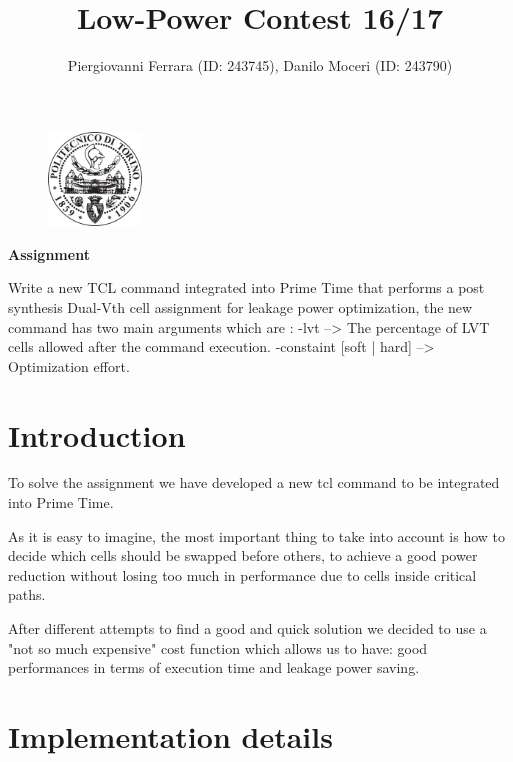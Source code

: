 \documentclass[a4paper,12pt]{article}
\begin{document}
	
	
	\begin{figure}
		\centering
		\includegraphics[width=2.5cm]{poli}
		\label{fig:poli}
	\end{figure}

	\title{Low-Power Contest 16/17}
	\author{Piergiovanni Ferrara (ID: 243745), Danilo Moceri (ID: 243790)}
	\maketitle
	
		\centering
		\textbf{Assignment}
		
		\vspace{1em}
		
		\raggedright
		Write a new TCL command integrated into Prime Time that performs a post synthesis Dual-Vth cell assignment for leakage power optimization, the new command has two main arguments which are :
		\newline
		\newline
		-lvt --> The percentage of LVT cells allowed after the command execution.
		-constaint [soft | hard] --> Optimization effort.

\section*{Introduction}
	
	To solve the assignment we have developed a new tcl command to be integrated into Prime Time.
	
	As it is easy to imagine, the most important thing to take into account is how to decide which cells should be swapped before others, to achieve a good power reduction without losing too much in performance due to cells inside critical paths.
	
	After different attempts to find a good and quick solution we decided to use a "not so much expensive" cost function which allows us to have: good performances in terms of execution time and leakage power saving.

\section*{Implementation details}
\end{document}
